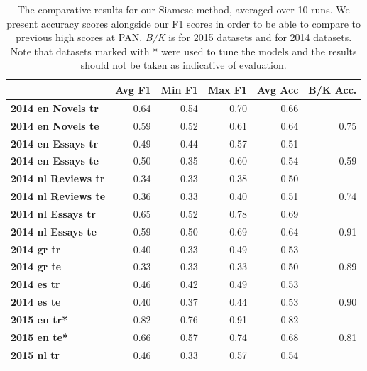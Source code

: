 \begin{table}[ht]
\caption{\label{tab:siameseres} The comparative results for our Siamese method, averaged over 10 runs. We present accuracy scores alongside our F1 scores in order to be able to compare to previous high scores at PAN. \textit{B/K} is \citet{bagnall2015author} for 2015 datasets and \citet{khonji2014slightly} for 2014 datasets. Note that datasets marked with * were used to tune the models and the results should not be taken as indicative of evaluation.}
\begin{center}
\begin{tabular}{lrrrrr} 
\toprule
                       &  \bf Avg F1 & \bf Min F1 & \bf Max F1 & \bf Avg Acc & \bf B/K Acc. \\
\midrule
\bf 2014 en Novels tr     &   0.64    & 0.54         & 0.70      & 0.66   &          \\
\bf 2014 en Novels te     &   0.59        & 0.52     & 0.61     & 0.64   &   0.75    \\
\bf 2014 en Essays tr     &   0.49       & 0.44      & 0.57     & 0.51   &           \\
\bf 2014 en Essays te     &   0.50     & 0.35        &  0.60    & 0.54   &   0.59   \\
\bf 2014 nl Reviews tr     &   0.34     & 0.33        &  0.38   & 0.50  &           \\
\bf 2014 nl Reviews te     &   0.36     & 0.33        &  0.40    & 0.51  &    0.74   \\
\bf 2014 nl Essays tr     &   0.65     & 0.52        &  0.78    & 0.69  &           \\
\bf 2014 nl Essays te     &   0.59     & 0.50        &  0.69    & 0.64  &   0.91    \\
\bf 2014 gr tr             &   0.40     & 0.33        &  0.49   & 0.53  &           \\
\bf 2014 gr te             &   0.33     & 0.33        &  0.33   & 0.50  &   0.89    \\
\bf 2014 es tr             &   0.46     & 0.42        &  0.49   & 0.53  &           \\
\bf 2014 es te             &   0.40     & 0.37        &  0.44   & 0.53  &      0.90 \\
\bf 2015 en tr*             &   0.82     & 0.76        &  0.91    &  0.82  &         \\
\bf 2015 en te*             &   0.66     & 0.57        &  0.74    &  0.68  &    0.81 \\
\bf 2015 nl tr             &   0.46     & 0.33        &  0.57    &  0.54  &         \\

\end{tabular}
\end{center}
\end{table}
